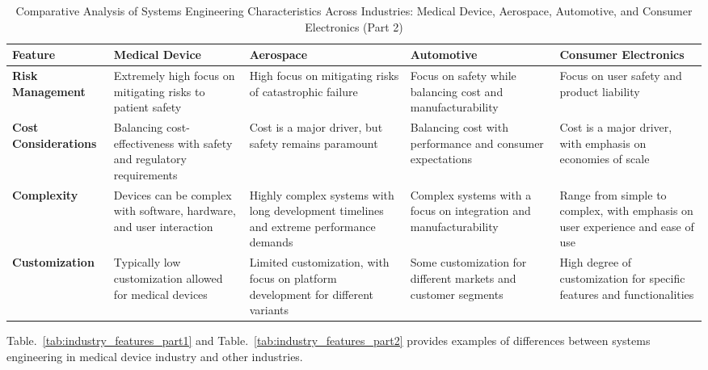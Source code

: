 \documentclass[conference]{IEEEtran}
\begin{document}
    \begin{table}[t]
        \caption{Comparative Analysis of Systems Engineering Characteristics Across Industries: Medical Device, Aerospace, Automotive, and Consumer Electronics (Part 2)}
        \label{tab:industry-comparison-part2}
        \centering
        \begin{tabular}{|p{2.5cm}|p{3.5cm}|p{3.5cm}|p{3.5cm}|p{3.5cm}|}
        \hline
        \textbf{Feature} & \textbf{Medical Device} & \textbf{Aerospace} & \textbf{Automotive} & \textbf{Consumer Electronics} \\ \hline
        \textbf{Risk Management} & Extremely high focus on mitigating risks to patient safety & High focus on mitigating risks of catastrophic failure & Focus on safety while balancing cost and manufacturability & Focus on user safety and product liability \\ \hline
        \textbf{Cost Considerations} & Balancing cost-effectiveness with safety and regulatory requirements & Cost is a major driver, but safety remains paramount & Balancing cost with performance and consumer expectations & Cost is a major driver, with emphasis on economies of scale \\ \hline
        \textbf{Complexity} & Devices can be complex with software, hardware, and user interaction & Highly complex systems with long development timelines and extreme performance demands & Complex systems with a focus on integration and manufacturability & Range from simple to complex, with emphasis on user experience and ease of use \\ \hline
        \textbf{Customization} & Typically low customization allowed for medical devices & Limited customization, with focus on platform development for different variants & Some customization for different markets and customer segments & High degree of customization for specific features and functionalities \\ \hline
        \end{tabular}
    \end{table}

    Table.~\ref{tab:industry_features_part1} and Table.~\ref{tab:industry_features_part2} provides examples of differences between systems 
    engineering in medical device industry and other 
    industries.
    
\end{document}
